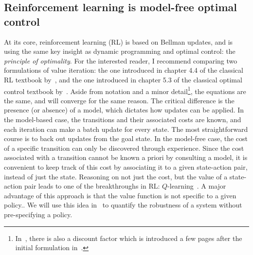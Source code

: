 \subsection{Reinforcement learning is model-free optimal control}
At its core, reinforcement learning (RL) is based on Bellman updates, and is using the same key insight as dynamic programming and optimal control: the \emph{principle of optimality}.
For the interested reader, I recommend comparing two formulations of value iteration: the one introduced in chapter 4.4 of the classical RL textbook by~\textcite{sutton2018book}, and the one introduced in chapter 5.3 of the classical optimal control textbook by~\textcite{bertsekas2017book}. Aside from notation and a minor detail\footnote{In~\cite{sutton2018book}, there is also a discount factor which is introduced a few pages after the initial formulation in~\cite{bertsekas2017book}.}, the equations are the same, and will converge for the same reason. The critical difference is the presence (or absence) of a model, which dictates how updates can be applied.
In the model-based case, the transitions and their associated costs are known, and each iteration can make a batch update for every state. The most straightforward course is to back out updates from the goal state. In the model-free case, the cost of a specific transition can only be discovered through experience.
Since the cost associated with a transition cannot be known a priori by consulting a model, it is convenient to keep track of this cost by associating it to a given state-action pair, instead of just the state. Reasoning on not just the cost, but the value of a state-action pair leads to one of the breakthroughs in RL: $Q$-learning~\cite[cf. chapter 6.5]{sutton2018book}. A major advantage of this approach is that the value function is not specific to a given policy.. We will use this idea in~\cite{heim2019beyond} to quantify the robustness of a system without pre-specifying a policy.

